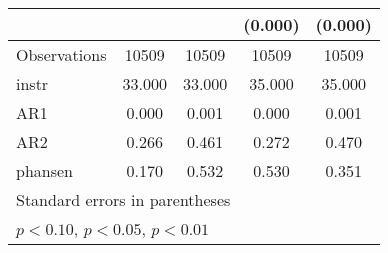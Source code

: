 \begin{table}[htbp]
\begin{tabular}{l*{4}{c}}
                &                  &                  &  (0.000)         &  (0.000)         \\
\hline
Observations    &    10509         &    10509         &    10509         &    10509         \\
instr           &   33.000         &   33.000         &   35.000         &   35.000         \\
AR1             &    0.000         &    0.001         &    0.000         &    0.001         \\
AR2             &    0.266         &    0.461         &    0.272         &    0.470         \\
phansen         &    0.170         &    0.532         &    0.530         &    0.351         \\
\hline\hline
\multicolumn{5}{l}{\footnotesize Standard errors in parentheses}\\
\multicolumn{5}{l}{\footnotesize \sym{*} \(p<0.10\), \sym{**} \(p<0.05\), \sym{***} \(p<0.01\)}\\
\end{tabular}
\end{table}
